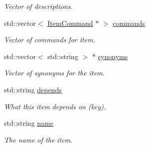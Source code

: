 \begin{DoxyCompactItemize}
\begin{DoxyCompactList}\small\item\em \-Vector of descriptions. \end{DoxyCompactList}\item 
\hypertarget{class_item_add7e6704ad626679f70ff8f2ae76698c}{
std\-::vector$<$ \hyperlink{class_item_command}{\-Item\-Command} $\ast$ $>$ \hyperlink{class_item_add7e6704ad626679f70ff8f2ae76698c}{commands}}
\label{class_item_add7e6704ad626679f70ff8f2ae76698c}

\begin{DoxyCompactList}\small\item\em \-Vector of commands for item. \end{DoxyCompactList}\item 
\hypertarget{class_item_a7194157fbfb03b0f18a26c9653bb5ece}{
std\-::vector$<$ std\-::string $>$ $\ast$ \hyperlink{class_item_a7194157fbfb03b0f18a26c9653bb5ece}{synonyms}}
\label{class_item_a7194157fbfb03b0f18a26c9653bb5ece}

\begin{DoxyCompactList}\small\item\em \-Vector of synonyms for the item. \end{DoxyCompactList}\item 
\hypertarget{class_item_a921cd9db367f9d02a79667add82b2e04}{
std\-::string \hyperlink{class_item_a921cd9db367f9d02a79667add82b2e04}{depends}}
\label{class_item_a921cd9db367f9d02a79667add82b2e04}

\begin{DoxyCompactList}\small\item\em \-What this item depends on (key). \end{DoxyCompactList}\item 
\hypertarget{class_item_a342b7a351c9ae1c5430aa3ef65b670bd}{
std\-::string \hyperlink{class_item_a342b7a351c9ae1c5430aa3ef65b670bd}{name}}
\label{class_item_a342b7a351c9ae1c5430aa3ef65b670bd}

\begin{DoxyCompactList}\small\item\em \-The name of the item. \end{DoxyCompactList}\end{DoxyCompactItemize}


